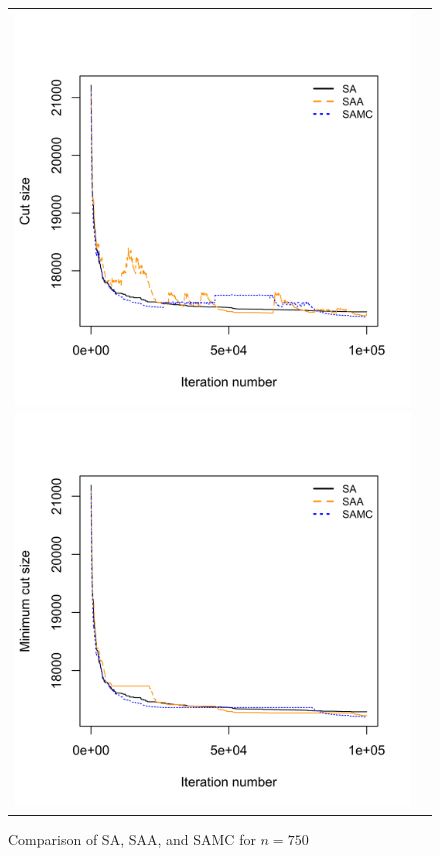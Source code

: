 \documentclass[11pt,]{article}
\begin{document}
\begin{figure}[hbpt]
  \begin{tabular}{cc}
    \includegraphics[width=.5\textwidth]{images/graph_cut_n750_iter1e+05}
    \includegraphics[width=.5\textwidth]{images/graph_min_cut_n750_iter1e+05}
  \end{tabular}
  \caption{Comparison of SA, SAA, and SAMC for $n = 750$}
  \label{fig:n750}
\end{figure}
\end{document}
